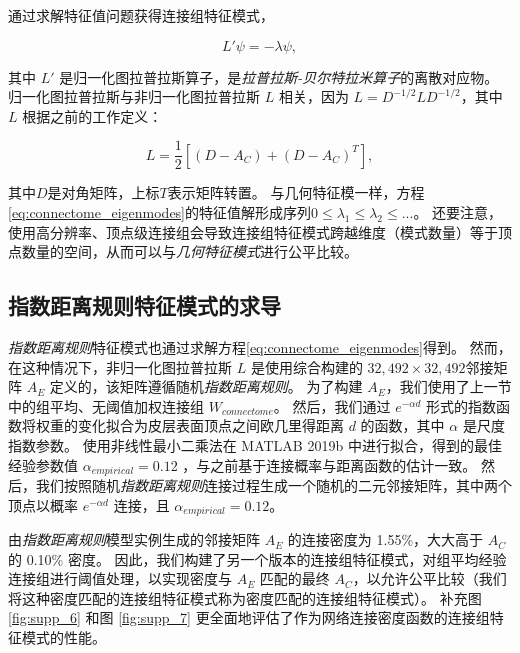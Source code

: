 \documentclass[lang=cn,a4paper,newtx,citestyle=gb7714-2015, bibstyle=gb7714-2015]{elegantpaper}
\begin{document}
通过求解特征值问题获得连接组特征模式，


\begin{equation}\label{eq:connectome_eigenmodes}
	L' \psi = - \lambda \psi,
\end{equation}

其中 $ L' $ 是归一化图拉普拉斯算子，是\textit{拉普拉斯-贝尔特拉米算子}的离散对应物。
归一化图拉普拉斯与非归一化图拉普拉斯 $ L $ 相关，因为 $ L = D^{−1/2}LD^{−1/2} $，其中 $ L $ 根据之前的工作\cite{levy2006laplace}定义：

\begin{equation}\label{eq:unnormalized_Laplacian}
	L = \frac{1}{2} [ (D-A_C) + (D-A_C)^T ],
\end{equation}

其中$ D $是对角矩阵，上标$ T $表示矩阵转置。
与几何特征模一样，方程\ref{eq:connectome_eigenmodes}的特征值解形成序列$ 0 \leq \lambda_1 \leq \lambda_2 \leq ... $。
还要注意，使用高分辨率、顶点级连接组会导致连接组特征模式跨越维度（模式数量）等于顶点数量的空间，从而可以与\textit{几何特征模式}进行公平比较。



\subsection{指数距离规则特征模式的求导} \label{sec:EDR_derivation}

\textit{指数距离规则}特征模式也通过求解方程\ref{eq:connectome_eigenmodes}得到。
然而，在这种情况下，非归一化图拉普拉斯 $ L $ 是使用综合构建的 $ 32,492 \times 32,492  $邻接矩阵 $ A_E $ 定义的，该矩阵遵循随机\textit{指数距离规则}。
为了构建 $ A_E $，我们使用了上一节中的组平均、无阈值加权连接组 $ W_{connectome} $。
然后，我们通过 $ e^{-\alpha d} $ 形式的指数函数将权重的变化拟合为皮层表面顶点之间欧几里得距离 $ d $ 的函数，其中 $ \alpha $ 是尺度指数参数。
使用非线性最小二乘法在 MATLAB 2019b 中进行拟合，得到的最佳经验参数值 $ \alpha_{empirical} = 0.12 $ ，与之前基于连接概率与距离函数的估计一致\cite{theodoni2022structural}。
然后，我们按照随机\textit{指数距离规则}连接过程生成一个随机的二元邻接矩阵，其中两个顶点以概率 $ e^{-\alpha d} $ 连接，且 $ \alpha_{empirical} = 0.12 $。


由\textit{指数距离规则}模型实例生成的邻接矩阵 $ A_E $ 的连接密度为 1.55\%，大大高于 $ A_C $ 的 0.10\% 密度。
因此，我们构建了另一个版本的连接组特征模式，对组平均经验连接组进行阈值处理，以实现密度与 $ A_E $ 匹配的最终 $ A_C $，以允许公平比较（我们将这种密度匹配的连接组特征模式称为密度匹配的连接组特征模式）。
补充图\ref{fig:supp_6} 和图 \ref{fig:supp_7} 更全面地评估了作为网络连接密度函数的连接组特征模式的性能。
\end{document}
